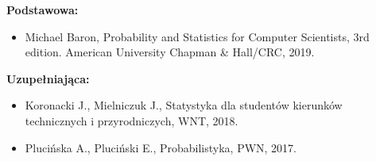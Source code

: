 \documentclass[12pt, a4paper]{article}
\begin{document}
\textbf{Podstawowa:}
\begin{itemize}
  \item Michael Baron, Probability and Statistics for Computer Scientists, 3rd edition. American University Chapman \& Hall/CRC, 2019.
\end{itemize}

\textbf{Uzupełniająca:}
\begin{itemize}
  \item Koronacki J., Mielniczuk J., Statystyka dla studentów kierunków technicznych i przyrodniczych, WNT, 2018.
  \item Plucińska A., Pluciński E., Probabilistyka, PWN, 2017.
\end{itemize}
\end{document}
